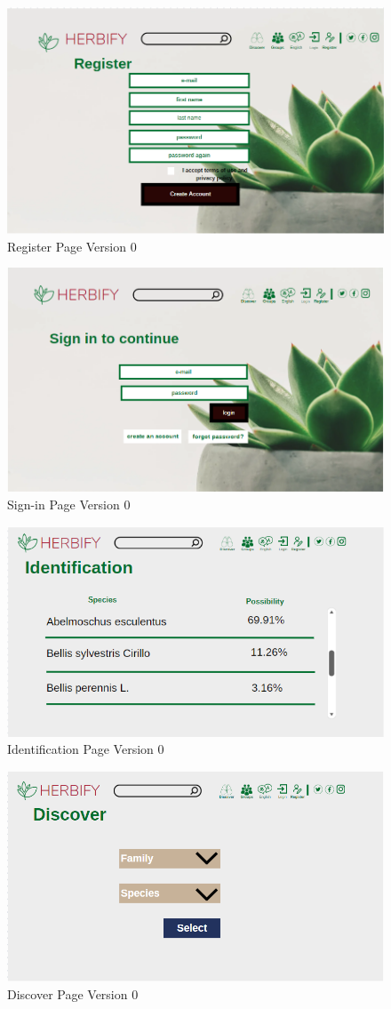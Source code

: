 \documentclass[conference]{IEEEtran}
\begin{document}
\begin{figure}[H]
\centerline{\includegraphics[width=0.48 \textwidth]{images/registerv0.png}}
\caption{Register Page Version 0}
\label{fig:graph1}
\end{figure}

\begin{figure}[H]
\centerline{\includegraphics[width=0.48 \textwidth]{images/sign-inv0.png}}
\caption{Sign-in Page Version 0}
\label{fig:graph1}
\end{figure}

\begin{figure}[H]
\centerline{\includegraphics[width=0.48 \textwidth]{images/identificationv0.png}}
\caption{Identification Page Version 0}
\label{fig:graph1}
\end{figure}

\begin{figure}[H]
\centerline{\includegraphics[width=0.48 \textwidth]{images/discoverv0.png}}
\caption{Discover Page Version 0}
\label{fig:graph1}
\end{figure}
\end{document}
